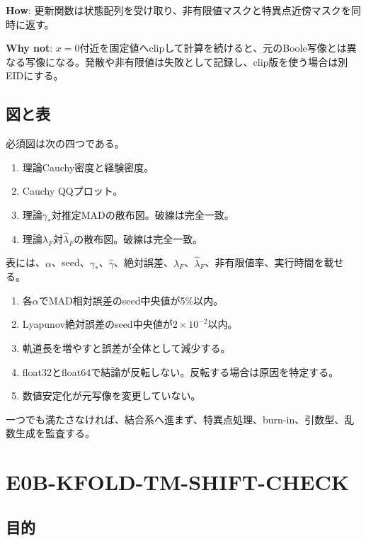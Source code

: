 \documentclass[a4paper,11pt,oneside,openany]{ltjsbook}
\begin{document}
\begin{codebox}
\textbf{How}: 更新関数は状態配列を受け取り、非有限値マスクと特異点近傍マスクを同時に返す。\par
\textbf{Why not}: \(x=0\)付近を固定値へclipして計算を続けると、元のBoole写像とは異なる写像になる。発散や非有限値は失敗として記録し、clip版を使う場合は別EIDにする。
\end{codebox}

\subsection{図と表}

必須図は次の四つである。

\begin{enumerate}
  \item 理論Cauchy密度と経験密度。
  \item Cauchy QQプロット。
  \item 理論\(\gamma_*\)対推定MADの散布図。破線は完全一致。
  \item 理論\(\lambda_F\)対\(\widehat\lambda_F\)の散布図。破線は完全一致。
\end{enumerate}

表には、\(\alpha\)、seed、\(\gamma_*\)、\(\widehat\gamma\)、絶対誤差、\(\lambda_F\)、\(\widehat\lambda_F\)、非有限値率、実行時間を載せる。

\begin{gatebox}
\begin{enumerate}
  \item 各\(\alpha\)でMAD相対誤差のseed中央値が5\%以内。
  \item Lyapunov絶対誤差のseed中央値が\(2\times10^{-2}\)以内。
  \item 軌道長を増やすと誤差が全体として減少する。
  \item float32とfloat64で結論が反転しない。反転する場合は原因を特定する。
  \item 数値安定化が元写像を変更していない。
\end{enumerate}
一つでも満たさなければ、結合系へ進まず、特異点処理、burn-in、引数型、乱数生成を監査する。
\end{gatebox}

\section{E0B-KFOLD-TM-SHIFT-CHECK}

\subsection{目的}
\end{document}

